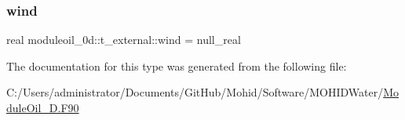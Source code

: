 \subsubsection{\texorpdfstring{wind}{wind}}
{\footnotesize\ttfamily real moduleoil\+\_\+0d\+::t\+\_\+external\+::wind = null\+\_\+real\hspace{0.3cm}{\ttfamily [private]}}



The documentation for this type was generated from the following file\+:\begin{DoxyCompactItemize}
\item 
C\+:/\+Users/administrator/\+Documents/\+Git\+Hub/\+Mohid/\+Software/\+M\+O\+H\+I\+D\+Water/\mbox{\hyperlink{_module_oil__0_d_8_f90}{Module\+Oil\+\_\+D.\+F90}}\end{DoxyCompactItemize}
